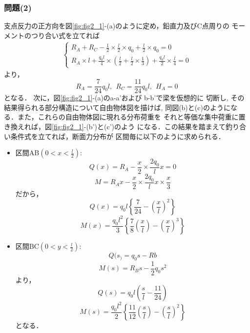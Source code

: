 \documentclass[10pt,a4j]{jarticle}
\begin{document}
\subsubsection*{問題(2)}
支点反力の正方向を図\ref{fig:fig2_1}-(a)のように定め，鉛直力及びC点周りの
モーメントのつり合い式を立てれば
\begin{eqnarray}
	\left\{
	\begin{array}{ll}
		R_A+R_C-\frac{1}{2}\times \frac{l}{2}\times q_0 + \frac{l}{2}\times q_0=0
		\\
		R_A\times l 
		+\frac{q_0l}{4}\times \left(\frac{l}{2}+\frac{l}{2}\times \frac{1}{3}\right)
		+\frac{q_0l}{2}\times \frac{l}{4}
		=0
	\end{array}
	\right.
\end{eqnarray}
より，
\begin{equation}
	R_A=\frac{7}{24}q_0l, \ \ R_C=\frac{11}{24}q_0l, \ \ H_A=0
\end{equation}
となる．
次に，図\ref{fig:fig2_1}-(a)のa-a'および b-b'で梁を仮想的に
切断し, その結果得られる部分構造について自由物体図を描けば, 
同図(b)と(c)のようになる．また，これらの自由物体図に現れる分布荷重を
それと等価な集中荷重に置き換えれば，図\ref{fig:fig2_1}-(b')と(c')のよう
になる．この結果を踏まえて釣り合い条件式を立てれば，断面力分布が
区間毎に以下のように求められる．
\begin{itemize}
\item
	区間AB$\left( 0<x<\frac{l}{2}\right)$:\\
	\begin{equation}
		Q(x)=R_A-\frac{x}{2}\times \frac{2q_0}{l}x =0
	\end{equation}
	\begin{equation}
		M=R_Ax-
		\frac{x}{2}\times
		\frac{2q_0}{l}x \times\frac{x}{3}
	\end{equation}
	だから，
	\begin{equation}
		Q(x) =
		q_0l \left\{ 
			\frac{7}{24} -\left( \frac{x}{l} \right)^2
		\right\}
	\end{equation}
	\begin{equation}
		M(x) =
		\frac{q_0l^2}{3} \left\{ 
			\frac{7}{8}\left(\frac{x}{l}\right) - \left( \frac{x}{l} \right)^3
		\right\}
	\end{equation}
\item
	区間BC$\left( 0<y<\frac{l}{2}\right)$:\\
	\begin{equation}
		Q(s_)=q_0s-Rb
	\end{equation}
	\begin{equation}
		M(s)=R_Bs -\frac{1}{2}q_0s^2 
	\end{equation}
	より，
	\begin{equation}
		Q(s) =q_0l\left( \frac{s}{l}-\frac{11}{24}\right)
	\end{equation}
	\begin{equation}
		M(s) =\frac{q_0l^2}{2} 
		\left\{ \frac{11}{12}\left(\frac{s}{l}\right)-\left(\frac{s}{l}\right)^2 \right\}
	\end{equation}
	となる．
\end{itemize}
\end{document}
